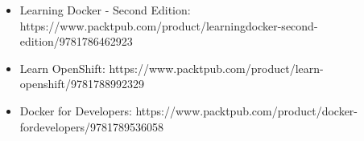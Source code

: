 

\begin{itemize}
\item 
Learning Docker - Second Edition: https://www.packtpub.com/product/learningdocker-second-edition/9781786462923

\item 
Learn OpenShift: https://www.packtpub.com/product/learn-openshift/9781788992329

\item 
Docker for Developers: https://www.packtpub.com/product/docker-fordevelopers/9781789536058
\end{itemize}